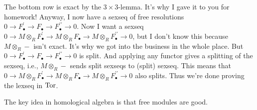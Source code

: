 The bottom row is exact by the $3\times 3$-lemma. It's why I gave it to you for homework! Anyway, I now have a sexseq of free resolutions $0\to F^\prime_\bullet\to F_\bullet\to F^{\prime\prime}_\bullet\to 0$. Now I want a sexseq $0\to M\otimes_R F^\prime_\bullet\to M\otimes_R F_\bullet\to M\otimes_R F^{\prime\prime}_\bullet\to 0$, but I don't know this because $M\otimes_R -$ isn't exact. It's why we got into the business in the whole place. But $0\to F^\prime_\bullet\to F_\bullet\to F^{\prime\prime}_\bullet\to 0$ is split. And applying any functor gives a splitting of the sexseq, i.e., $M\otimes_R -$ sends split sexseqs to (split) sexseq. This means that $0\to M\otimes_R F^\prime_\bullet\to M\otimes_R F_\bullet\to M\otimes_R F^{\prime\prime}_\bullet\to 0$ also splits. Thus we're done proving the lexseq in $\operatorname{Tor}$.

The key idea in homological algebra is that free modules are good.
